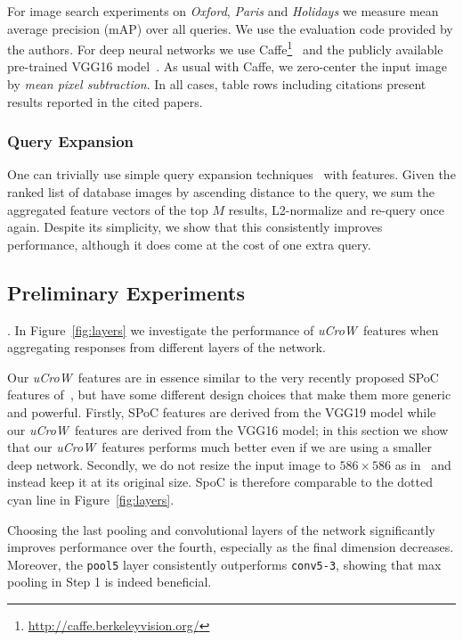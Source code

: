 \documentclass[runningheads]{llncs}
\newcommand{\uCrow}{\textit{uCroW}~}
\newcommand{\Sup}{\textit{\uCrow}}
\newcommand{\SuP}{\textit{\uCrow}}
\begin{document}
For image search experiments on \emph{Oxford}, \emph{Paris} and \emph{Holidays} we measure mean average precision (mAP) over all queries. We use the evaluation code provided by the authors.
For deep neural networks we use Caffe\footnote{\url{http://caffe.berkeleyvision.org/}}~\cite{YSD+14} and the publicly available pre-trained VGG16 model~\cite{SiZi14}. As usual with Caffe, we zero-center the input image by \textit{mean pixel subtraction}.
In all cases, table rows including citations present results reported in the cited papers.

\subsubsection{Query Expansion}

One can trivially use simple query expansion techniques~\cite{CPS+07} with \Crow features. Given the ranked list of database images by ascending distance to the query, we sum the aggregated feature vectors of the top $M$ results, L2-normalize and re-query once again. Despite its simplicity, we show that this consistently improves performance, although it does come at the cost of one extra query.
%
 
\subsection{Preliminary Experiments}
\label{subsec:exp_prelim}

. In Figure~\ref{fig:layers} we investigate the performance of \Sup features when aggregating responses from different layers of the network.

Our \uCrow features are in essence similar to the very recently proposed SPoC features of~\cite{BaLe15}, but have some different design choices that make them more generic and powerful. Firstly, SPoC features are derived from the VGG19 model while our \SuP features are derived from the VGG16 model; in this section we show that our \SuP features performs much better even if we are using a smaller deep network. Secondly, we do not resize the input image to $586 \times 586$ as in~\cite{BaLe15} and instead keep it at its original size. SpoC is therefore comparable to the dotted cyan line in Figure~\ref{fig:layers}.

Choosing the last pooling and convolutional layers of the network significantly improves performance over the fourth, especially as the final dimension decreases. Moreover, the \texttt{pool5} layer consistently outperforms \texttt{conv5-3}, showing that max pooling in Step 1 is indeed beneficial. 
\end{document}
